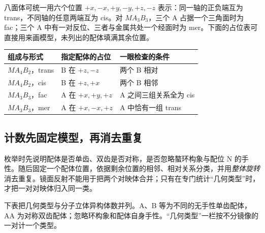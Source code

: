 \begin{center}
\end{center}

八面体可统一用六个位置 $+x,-x,+y,-y,+z,-z$ 表示：同一轴的正负端互为 trans，不同轴的任意两端互为 cis。对 $MA_3B_3$，三个 A 占据一个三角面时为 fac；三个 A 中有一对反位、三者与金属共处一个经面时为 mer。下面的占位表可直接用来画模型，未列出的配体填满其余位置。

\begin{center}
\small
\begin{tabular}{@{}lll@{}}
\toprule
组成与形式 & 指定配体的占位 & 一眼检查的条件 \\
\midrule
$MA_4B_2$，trans & B 在 $+z,-z$ & 两个 B 相对 \\
$MA_4B_2$，cis & B 在 $+z,+x$ & 两个 B 相邻 \\
$MA_3B_3$，fac & A 在 $+x,+y,+z$ & A 之间三组关系全为 cis \\
$MA_3B_3$，mer & A 在 $+x,-x,+z$ & A 中恰有一组 trans \\
\bottomrule
\end{tabular}
\end{center}

\subsection{计数先固定模型，再消去重复}
枚举时先说明配体是否单齿、双齿是否对称，是否忽略螯环构象与配位 N 的手性。随后固定一个配体位置，依据剩余位置的相邻、相对关系分类，并用\emph{整体旋转}消去重复。镜面反射不能用于把两个对映体合并；只有在专门统计“几何类型”时，才把一对对映体归入同一类。

下表把几何类型与分子立体异构体数并列。A、B 等为不同的无手性单齿配体，AA 为对称双齿配体；忽略环构象和配体自身手性。“几何类型”一栏按不分镜像的一对计一个类型。

